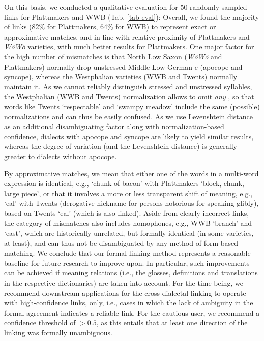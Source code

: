 On this basis, we conducted a qualitative evaluation for 50 randomly sampled links for Plattmakers and WWB (Tab. \ref{tab-eval}): 
Overall, we found the majority of links (82\% for Plattmakers, 64\% for WWB) to represent exact or approximative matches, and in line with relative proximity of Plattmakers and \emph{WöWö} varieties, with much better results for Plattmakers. One major factor for the high number of mismatches is that North Low Saxon (\emph{WöWö} and Plattmakers) normally drop unstressed Middle Low German e (apocope and syncope), whereas the Westphalian varieties (WWB and Twents) normally maintain it. 
As we cannot reliably distinguish stressed and unstressed syllables, the Westphalian (WWB and Twents) normalization allows to omit \emph{any} , so that words like Twents  `respectable' and  `swampy meadow' include the same (possible) normalizations and can thus be easily confused. As we use Levenshtein distance as an additional disambiguating factor along with normalization-based confidence, dialects with apocope and syncope are likely to yield similar results, whereas the degree of variation (and the Levenshtein distance) is generally greater to dialects without apocope.

By approximative matches, we mean that either one of the words in a multi-word expression is identical, e.g.,  `chunk of bacon' with Plattmakers  `block, chunk, large piece', or that it involves a more or less transparent shift of meaning, e.g.,  `eal' with Twents  (derogative nickname for persons notorious for speaking glibly), based on Twents  `eal' (which is also linked). 
Aside from clearly incorrect links, the category of mismatches also includes homophones, e.g., WWB  `branch' and  `east', which are historically unrelated, but formally identical (in some varieties, at least), and can thus not be disambiguated by any method of form-based matching.  We conclude that our formal linking method represents a reasonable baseline for future research to improve upon.
In particular, such improvements can be achieved if meaning relations (i.e., the glosses, definitions and translations in the respective dictionaries) are taken into account. 
For the time being, we recommend downstream applications for the cross-dialectal linking to operate with high-confidence links, only, i.e., cases in which the lack of ambiguity in the formal agreement indicates a reliable link. For the cautious user, we recommend a confidence threshold of $>0.5$, as this entails that at least one direction of the linking was formally unambiguous. 

